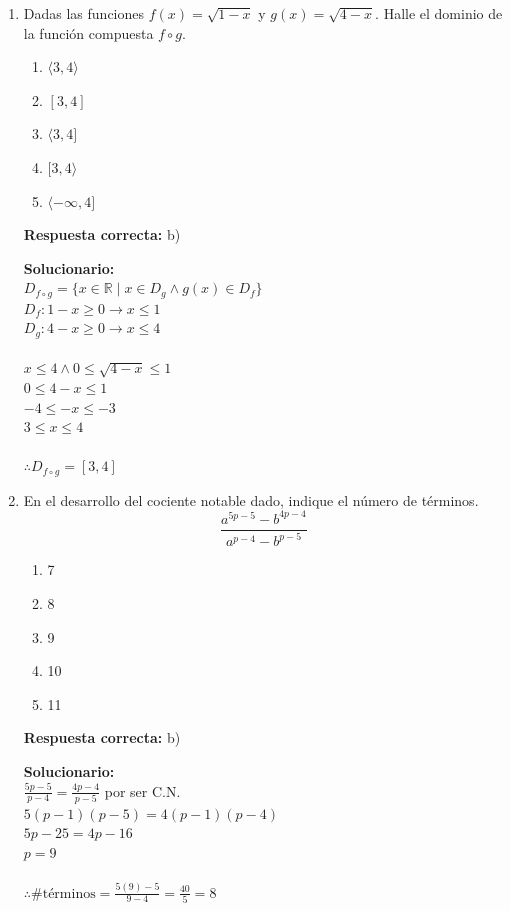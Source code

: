 \begin{enumerate}
	\vspace{6mm}
	
	\item Dadas las funciones $f(x) = \sqrt{1-x}$ y $g(x) = \sqrt{4-x}$. Halle el dominio de la función compuesta $f \circ g$.
	\begin{enumerate}[label=\alph*)]
		\item $\langle3,4\rangle$
		\item $[3, 4]$
		\item $\langle3, 4]$
		\item $[3, 4\rangle$
		\item $\langle -\infty , 4]$
	\end{enumerate}
	\textbf{Respuesta correcta:} b)
	
	\vspace{2mm}
	\textbf{Solucionario:}\\
	$D_{f \circ g} = \{ x \in \mathbb{R} \mid x \in D_g \wedge g(x) \in D_f \}$ \\
	$D_f: 1-x \geq 0 \rightarrow x \leq 1$ \\
	$D_g: 4-x \geq 0 \rightarrow x \leq 4$ \\
	\\
	$x \leq 4 \wedge 0 \leq \sqrt{4-x} \leq 1$ \\
	$0 \leq 4-x \leq 1$ \\
	$-4 \leq -x \leq -3$ \\
	$3 \leq x \leq 4$ \\
	\\
	$\therefore D_{f \circ g} = [3, 4]$
	
	\vspace{6mm}
	
	\item En el desarrollo del cociente notable dado, indique el número de términos.
	$$\frac{a^{5p-5} - b^{4p-4}}{a^{p-4} - b^{p-5}}$$
	\begin{enumerate}[label=\alph*)]
		\item 7
		\item 8
		\item 9
		\item 10
		\item 11	
	\end{enumerate}
	\textbf{Respuesta correcta:} b)
	
	\vspace{2mm}
	\textbf{Solucionario:}\\
	$\frac{5p-5}{p-4} = \frac{4p-4}{p-5}$ por ser C.N. \\
	$5(p-1)(p-5) = 4(p-1)(p-4)$ \\
	$5p - 25 = 4p - 16$ \\
	$p = 9$ \\
	\\
	$\therefore \# \text{términos} = \frac{5(9)-5}{9-4} = \frac{40}{5} = 8$
	
	\vspace{6mm}
	
\end{enumerate}



